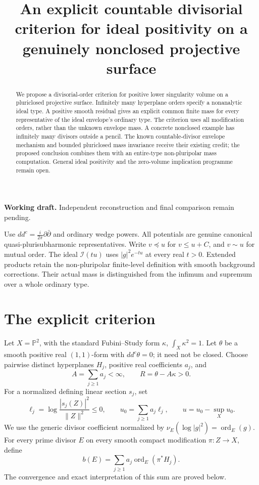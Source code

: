 \documentclass[11pt]{article}
\title{An explicit countable divisorial criterion for ideal positivity\newline
on a genuinely nonclosed projective surface}
\author{}\date{}
\newcommand{\ddc}{dd^c}
\theoremstyle{remark}\newtheorem{remark}[theorem]{Remark}
\begin{document}
\maketitle
\noindent\textbf{Working draft.} Independent reconstruction
and final comparison remain pending.
\begin{abstract}
We propose a divisorial-order criterion for positive lower singularity
volume on a pluriclosed projective surface. Infinitely many hyperplane
orders specify a nonanalytic ideal type. A positive smooth residual gives
an explicit common finite mass for every representative of the ideal
envelope's ordinary type. The criterion uses all modification orders,
rather than the unknown envelope mass. A concrete nonclosed example has
infinitely many divisors outside a pencil. The known countable-divisor
envelope mechanism and bounded pluriclosed mass invariance receive their
existing credit; the proposed conclusion combines them with an entire-type
non-pluripolar mass computation. General ideal positivity and the
zero-volume implication programme remain open.
\end{abstract}

Use $\ddc=\frac{i}{2\pi}\partial\bar\partial$ and ordinary wedge powers.
All potentials are genuine canonical quasi-plurisubharmonic representatives.
Write $v\preceq u$ for $v\leq u+C$, and $v\sim u$ for mutual order.
The ideal $\mathcal I(tu)$ uses $|g|^2e^{-tu}$ at every real $t>0$.
Extended products retain the non-pluripolar finite-level definition with
smooth background corrections. Their actual mass is distinguished from
the infimum and supremum over a whole ordinary type.

\section{The explicit criterion}
Let $X=\mathbb P^2$, with the standard Fubini--Study form $\kappa$,
$\int_X\kappa^2=1$. Let $\theta$ be a smooth positive real $(1,1)$-form
with $\ddc\theta=0$; it need not be closed. Choose pairwise distinct
hyperplanes $H_j$, positive real coefficients $a_j$, and
\[
 A=\sum_{j\geq1}a_j<\infty,\qquad R=\theta-A\kappa>0.
\]
For a normalized defining linear section $s_j$, set
\[
 \ell_j=\log\frac{|s_j(Z)|^2}{\|Z\|^2}\leq0,
 \qquad u_0=\sum_{j\geq1}a_j\ell_j,
 \qquad u=u_0-\sup_Xu_0.
\]
We use the generic divisor coefficient normalized by
$\nu_E(\log|g|^2)=\operatorname{ord}_E(g)$.
For every prime divisor $E$ on every smooth compact modification
$\pi:Z\to X$, define
\begin{equation}\label{eq:profile}
 b(E)=\sum_{j\geq1}a_j\operatorname{ord}_E(\pi^*H_j).
\end{equation}
The convergence and exact interpretation of this sum are proved below.
\end{document}
